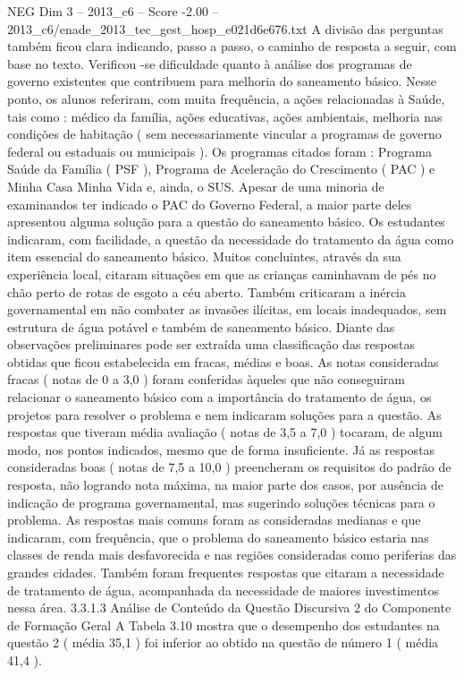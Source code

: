 \begin{textsample}{NEG Dim 3 – 2013\_c6 – Score -2.00 – 2013\_c6/enade\_2013\_tec\_gest\_hosp\_e021d6e676.txt}
A divisão das perguntas também ficou clara indicando, passo a passo, o caminho de resposta a seguir, com base no texto.
Verificou -se dificuldade quanto à análise dos programas de governo existentes que contribuem para melhoria do saneamento básico.
Nesse ponto, os alunos referiram, com muita frequência, a ações relacionadas à Saúde, tais como : médico da família, ações educativas, ações ambientais, melhoria nas condições de habitação ( sem necessariamente vincular a programas de governo federal ou estaduais ou municipais ).
Os programas citados foram : Programa Saúde da Família ( PSF ), Programa de Aceleração do Crescimento ( PAC ) e Minha Casa Minha Vida e, ainda, o SUS.
Apesar de uma minoria de examinandos ter indicado o PAC do Governo Federal, a maior parte deles apresentou alguma solução para a questão do saneamento básico.
Os estudantes indicaram, com facilidade, a questão da necessidade do tratamento da água como item essencial do saneamento básico.
Muitos concluintes, através da sua experiência local, citaram situações em que as crianças caminhavam de pés no chão perto de rotas de esgoto a céu aberto.
Também criticaram a inércia governamental em não combater as invasões ilícitas, em locais inadequados, sem estrutura de água potável e também de saneamento básico.
Diante das observações preliminares pode ser extraída uma classificação das respostas obtidas que ficou estabelecida em fracas, médias e boas.
As notas consideradas fracas ( notas de 0 a 3,0 ) foram conferidas àqueles que não conseguiram relacionar o saneamento básico com a importância do tratamento de água, os projetos para resolver o problema e nem indicaram soluções para a questão.
As respostas que tiveram média avaliação ( notas de 3,5 a 7,0 ) tocaram, de algum modo, nos pontos indicados, mesmo que de forma insuficiente.
Já as respostas consideradas boas ( notas de 7,5 a 10,0 ) preencheram os requisitos do padrão de resposta, não logrando nota máxima, na maior parte dos casos, por ausência de indicação de programa governamental, mas sugerindo soluções técnicas para o problema.
As respostas mais comuns foram as consideradas medianas e que indicaram, com frequência, que o problema do saneamento básico estaria nas classes de renda mais desfavorecida e nas regiões consideradas como periferias das grandes cidades.
Também foram frequentes respostas que citaram a necessidade de tratamento de água, acompanhada da necessidade de maiores investimentos nessa área. 3.3.1.3 Análise de Conteúdo da Questão Discursiva 2 do Componente de Formação Geral A Tabela 3.10 mostra que o desempenho dos estudantes na questão 2 ( média 35,1 ) foi inferior ao obtido na questão de número 1 ( média 41,4 ).

\end{textsample}
